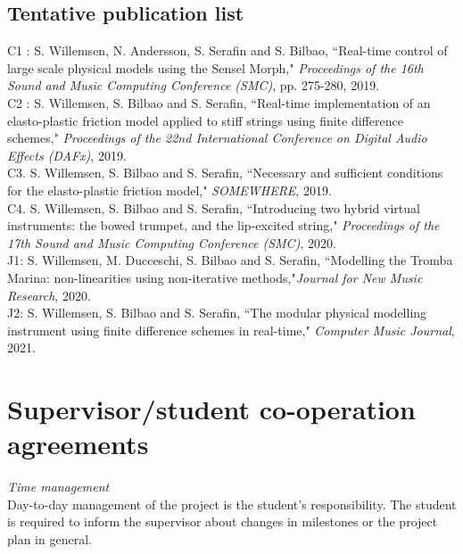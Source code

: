 \subsection{Tentative publication list}
C1 \cite{Willemsen2019a}: S. Willemsen, N. Andersson, S. Serafin and S. Bilbao, ``Real-time control of large scale physical models using the Sensel Morph," \textit{Proceedings of the 16th Sound and Music Computing Conference (SMC)}, pp. 275-280, 2019.
\vspace{0.15cm}
\\
C2 \cite{Willemsen2019b}: S. Willemsen, S. Bilbao and S. Serafin, ``Real-time implementation of an elasto-plastic friction model applied to stiff strings using finite difference schemes," \textit{Proceedings of the 22nd International Conference on Digital Audio Effects (DAFx)}, 2019.
\vspace{0.15cm}
\\
C3. S. Willemsen, S. Bilbao and S. Serafin, ``Necessary and sufficient conditions for the elasto-plastic friction model," \textit{SOMEWHERE}, 2019.
\vspace{0.15cm}
\\
C4. S. Willemsen, S. Bilbao and S. Serafin, ``Introducing two hybrid virtual instruments: the bowed trumpet, and the lip-excited string," \textit{Proceedings of the 17th Sound and Music Computing Conference (SMC)}, 2020.
\vspace{0.15cm}
\\
J1: S. Willemsen, M. Ducceschi, S. Bilbao and S. Serafin, ``Modelling the Tromba Marina: non-linearities using non-iterative methods,"\textit{Journal for New Music Research}, 2020.
\vspace{0.15cm}
\\
J2: S. Willemsen, S. Bilbao and S. Serafin, ``The modular physical modelling instrument using finite difference schemes in real-time," \textit{Computer Music Journal}, 2021.

\section{Supervisor/student co-operation agreements}
\textit{Time management}
\vspace{0.15cm}
\\
\noindent Day-to-day management of the project is the student’s responsibility. The student is required to inform the supervisor about changes in milestones or the project plan in general.
\\

